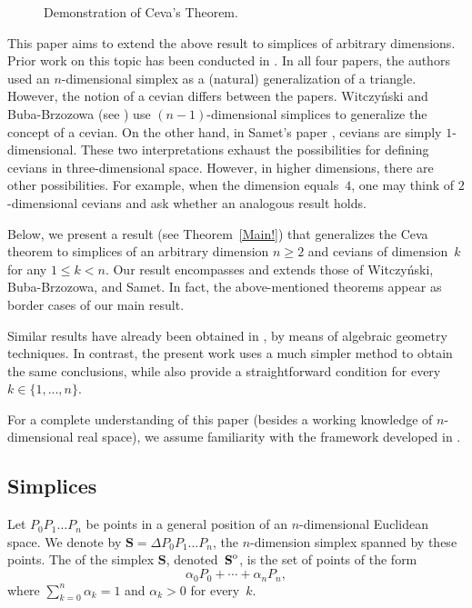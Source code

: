\documentclass[12pt, reqno]{amsart}
\theoremstyle{definition}
\theoremstyle{remark}
\numberwithin{equation}{section}
\newcommand{\interior}[1]{%
  {\kern0pt#1}^{\mathrm{o}}%
}
\begin{document}
{\begin{figure}
  \caption{Demonstration of Ceva's Theorem.}
\end{figure}

This paper aims to extend the above result to simplices of arbitrary dimensions. Prior work on this topic has been conducted in \cite{Buba-Brzozowa, Prince, Samet, Witczynski}. In all four papers, the authors used an $n$-dimensional simplex as a (natural) generalization of a triangle. However, the notion of a cevian differs between the papers. Witczyński and Buba-Brzozowa (see \cite{Witczynski,Buba-Brzozowa}) use $(n-1)$-dimensional simplices to generalize the concept of a cevian. On the other hand, in Samet's paper \cite{Samet}, cevians are simply $1$-dimensional. These two interpretations exhaust the possibilities for defining cevians in three-dimensional space. However, in higher dimensions, there are other possibilities. For example, when the dimension equals~$4$, one may think of $2$-dimensional cevians and ask whether an analogous result holds.

Below, we present a result (see Theorem~\ref{Main!}) that generalizes the Ceva theorem to simplices of an arbitrary dimension $n\geq 2$ and cevians of dimension~$k$ for any $1 \leq k < n$. Our result encompasses and extends those of Witczyński, Buba-Brzozowa, and Samet. In fact, the above-mentioned theorems appear as border cases of our main result.

Similar results have already been obtained in \cite{Prince}, by means of algebraic geometry techniques. In contrast, the present work uses a much simpler method to obtain the same conclusions, while also provide a straightforward condition for every $k\in\{1,...,n\}$. 

For a complete understanding of this paper (besides a working knowledge of $n$-dimensional real space), we assume familiarity with the framework developed in \cite{Samet}.

\subsection{Simplices}\label{symplex}
Let $P_0P_1\dots P_n$ be points in a general position of an $n$-dimensional Euclidean space. We denote by $\mathbf{S} = \Delta P_0P_1\dotsc P_n$, the $n$-dimension simplex spanned by these points. The  of the simplex $\mathbf{S}$, denoted~$\interior{\mathbf{S}}$, is the set of points of the form 
\[
\alpha_0P_0+\dotsb +\alpha_nP_n, 
\]
where $\sum^n_{k=0}\alpha_k=1$ and $\alpha_k>0$ for every~$k$.

}
\end{document}
